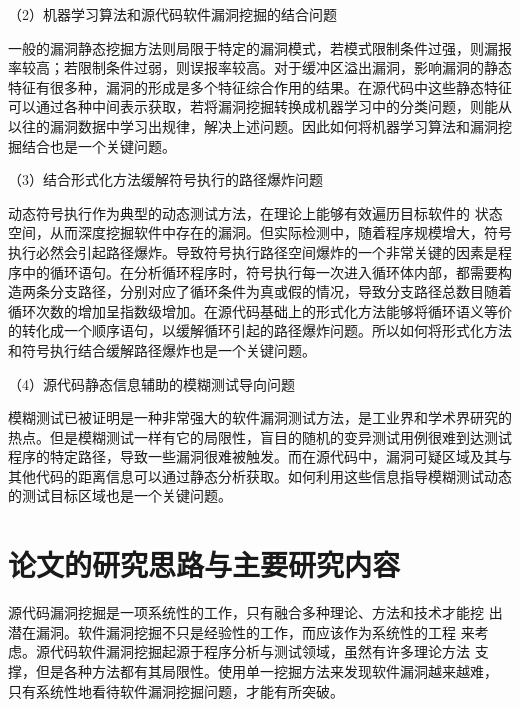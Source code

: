 （2）机器学习算法和源代码软件漏洞挖掘的结合问题

一般的漏洞静态挖掘方法则局限于特定的漏洞模式，若模式限制条件过强，则漏报率较高；若限制条件过弱，则误报率较高。对于缓冲区溢出漏洞，影响漏洞的静态特征有很多种，漏洞的形成是多个特征综合作用的结果。在源代码中这些静态特征可以通过各种中间表示获取，若将漏洞挖掘转换成机器学习中的分类问题，则能从以往的漏洞数据中学习出规律，解决上述问题。因此如何将机器学习算法和漏洞挖掘结合也是一个关键问题。


（3）结合形式化方法缓解符号执行的路径爆炸问题

动态符号执行作为典型的动态测试方法，在理论上能够有效遍历目标软件的 %
状态空间，从而深度挖掘软件中存在的漏洞。但实际检测中，随着程序规模增大，符号执行必然会引起路径爆炸。导致符号执行路径空间爆炸的一个非常关键的因素是程序中的循环语句。在分析循环程序时，符号执行每一次进入循环体内部，都需要构造两条分支路径，分别对应了循环条件为真或假的情况，导致分支路径总数目随着循环次数的增加呈指数级增加。在源代码基础上的形式化方法能够将循环语义等价的转化成一个顺序语句，以缓解循环引起的路径爆炸问题。所以如何将形式化方法和符号执行结合缓解路径爆炸也是一个关键问题。

（4）源代码静态信息辅助的模糊测试导向问题

模糊测试已被证明是一种非常强大的软件漏洞测试方法，是工业界和学术界研究的热点。但是模糊测试一样有它的局限性，盲目的随机的变异测试用例很难到达测试程序的特定路径，导致一些漏洞很难被触发。而在源代码中，漏洞可疑区域及其与其他代码的距离信息可以通过静态分析获取。如何利用这些信息指导模糊测试动态的测试目标区域也是一个关键问题。

\section{论文的研究思路与主要研究内容}
源代码漏洞挖掘是一项系统性的工作，只有融合多种理论、方法和技术才能挖
出潜在漏洞。软件漏洞挖掘不只是经验性的工作，而应该作为系统性的工程
来考虑。源代码软件漏洞挖掘起源于程序分析与测试领域，虽然有许多理论方法
支撑，但是各种方法都有其局限性。使用单一挖掘方法来发现软件漏洞越来越难，
只有系统性地看待软件漏洞挖掘问题，才能有所突破。

